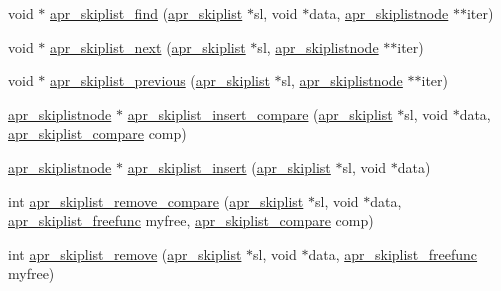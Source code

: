 \begin{DoxyCompactItemize}
\item 
void $\ast$ \hyperlink{group__apr__skiplist_gab28a7376e3483ae1104f2665d9859b95}{apr\-\_\-skiplist\-\_\-find} (\hyperlink{group__apr__skiplist_gac79ddf14bb5cb5b6d35961309eadec48}{apr\-\_\-skiplist} $\ast$sl, void $\ast$data, \hyperlink{group__apr__skiplist_gafb934f577d03de823aa4d62b41399bc0}{apr\-\_\-skiplistnode} $\ast$$\ast$iter)
\item 
void $\ast$ \hyperlink{group__apr__skiplist_gaca0e377b36847ed03c3a135f0f3f353e}{apr\-\_\-skiplist\-\_\-next} (\hyperlink{group__apr__skiplist_gac79ddf14bb5cb5b6d35961309eadec48}{apr\-\_\-skiplist} $\ast$sl, \hyperlink{group__apr__skiplist_gafb934f577d03de823aa4d62b41399bc0}{apr\-\_\-skiplistnode} $\ast$$\ast$iter)
\item 
void $\ast$ \hyperlink{group__apr__skiplist_ga02ff03a8282b561edf01b3291c154af4}{apr\-\_\-skiplist\-\_\-previous} (\hyperlink{group__apr__skiplist_gac79ddf14bb5cb5b6d35961309eadec48}{apr\-\_\-skiplist} $\ast$sl, \hyperlink{group__apr__skiplist_gafb934f577d03de823aa4d62b41399bc0}{apr\-\_\-skiplistnode} $\ast$$\ast$iter)
\item 
\hyperlink{group__apr__skiplist_gafb934f577d03de823aa4d62b41399bc0}{apr\-\_\-skiplistnode} $\ast$ \hyperlink{group__apr__skiplist_ga01b128d5160bc905f4b60a120ca10b2e}{apr\-\_\-skiplist\-\_\-insert\-\_\-compare} (\hyperlink{group__apr__skiplist_gac79ddf14bb5cb5b6d35961309eadec48}{apr\-\_\-skiplist} $\ast$sl, void $\ast$data, \hyperlink{group__apr__skiplist_ga4e5bca4c34a9932deee61c3ac4ed7d4a}{apr\-\_\-skiplist\-\_\-compare} comp)
\item 
\hyperlink{group__apr__skiplist_gafb934f577d03de823aa4d62b41399bc0}{apr\-\_\-skiplistnode} $\ast$ \hyperlink{group__apr__skiplist_ga1aaaa029b9f166baf320bf43e6887b4d}{apr\-\_\-skiplist\-\_\-insert} (\hyperlink{group__apr__skiplist_gac79ddf14bb5cb5b6d35961309eadec48}{apr\-\_\-skiplist} $\ast$sl, void $\ast$data)
\item 
int \hyperlink{group__apr__skiplist_ga9770c39604e7491da4c67282758690c2}{apr\-\_\-skiplist\-\_\-remove\-\_\-compare} (\hyperlink{group__apr__skiplist_gac79ddf14bb5cb5b6d35961309eadec48}{apr\-\_\-skiplist} $\ast$sl, void $\ast$data, \hyperlink{group__apr__skiplist_gaca5605cd1a65a8520e1ead5316cc0a0a}{apr\-\_\-skiplist\-\_\-freefunc} myfree, \hyperlink{group__apr__skiplist_ga4e5bca4c34a9932deee61c3ac4ed7d4a}{apr\-\_\-skiplist\-\_\-compare} comp)
\item 
int \hyperlink{group__apr__skiplist_ga682f5e7dfcc4359097b9a4b96d053eff}{apr\-\_\-skiplist\-\_\-remove} (\hyperlink{group__apr__skiplist_gac79ddf14bb5cb5b6d35961309eadec48}{apr\-\_\-skiplist} $\ast$sl, void $\ast$data, \hyperlink{group__apr__skiplist_gaca5605cd1a65a8520e1ead5316cc0a0a}{apr\-\_\-skiplist\-\_\-freefunc} myfree)
$$
\end{DoxyCompactItemize}
